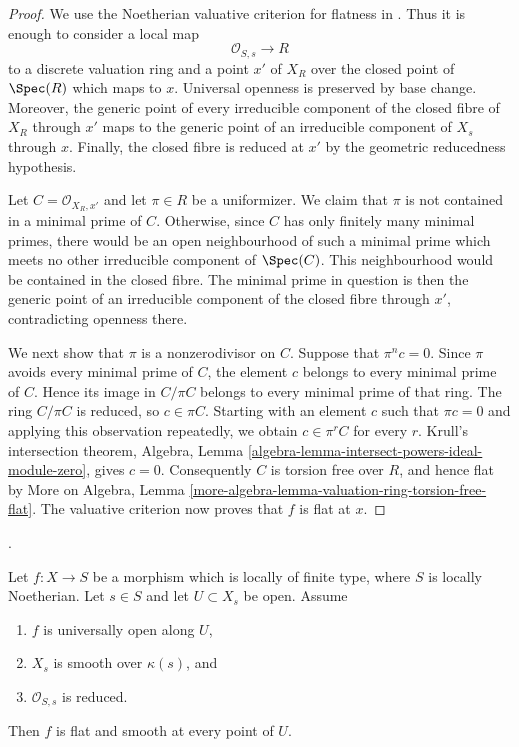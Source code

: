 \begin{proof}
We use the Noetherian valuative criterion for flatness in
\cite[IV, 11.8.1]{EGA}. Thus it is enough to consider a local map
$$
\mathcal{O}_{S,s} \longrightarrow R
$$
to a discrete valuation ring and a point $x'$ of $X_R$ over the closed
point of $\Spec(R)$ which maps to $x$. Universal openness is preserved by
base change. Moreover, the generic point of every irreducible component of
the closed fibre of $X_R$ through $x'$ maps to the generic point of an
irreducible component of $X_s$ through $x$. Finally, the closed fibre is
reduced at $x'$ by the geometric reducedness hypothesis.

Let $C=\mathcal{O}_{X_R,x'}$ and let $\pi \in R$ be a uniformizer. We claim
that $\pi$ is not contained in a minimal prime of $C$. Otherwise, since $C$
has only finitely many minimal primes, there would be an open neighbourhood
of such a minimal prime which meets no other irreducible component of
$\Spec(C)$. This neighbourhood would be contained in the closed fibre. The
minimal prime in question is then the generic point of an irreducible
component of the closed fibre through $x'$, contradicting openness there.

We next show that $\pi$ is a nonzerodivisor on $C$. Suppose that
$\pi^n c=0$. Since $\pi$ avoids every minimal prime of $C$, the element $c$
belongs to every minimal prime of $C$. Hence its image in $C/\pi C$ belongs
to every minimal prime of that ring. The ring $C/\pi C$ is reduced, so
$c \in \pi C$. Starting with an element $c$ such that $\pi c=0$ and applying
this observation repeatedly, we obtain $c \in \pi^rC$ for every $r$.
Krull's intersection theorem, Algebra, Lemma
\ref{algebra-lemma-intersect-powers-ideal-module-zero}, gives $c=0$.
Consequently $C$ is torsion free over $R$, and hence flat by More on
Algebra, Lemma
\ref{more-algebra-lemma-valuation-ring-torsion-free-flat}. The valuative
criterion now proves that $f$ is flat at $x$.
\end{proof}

\begin{lemma}
\label{corollary-universally-open-smooth-fibre-flat}
\begin{reference}
\cite[Expos\'e 236, Corollary 1.8, p. 229]{FGA}.
\end{reference}
Let $f : X \to S$ be a morphism which is locally of finite type, where $S$
is locally Noetherian. Let $s \in S$ and let $U \subset X_s$ be open.
Assume
\begin{enumerate}
\item $f$ is universally open along $U$,
\item $X_s$ is smooth over $\kappa(s)$, and
\item $\mathcal{O}_{S,s}$ is reduced.
\end{enumerate}
Then $f$ is flat and smooth at every point of $U$.
\end{lemma}

